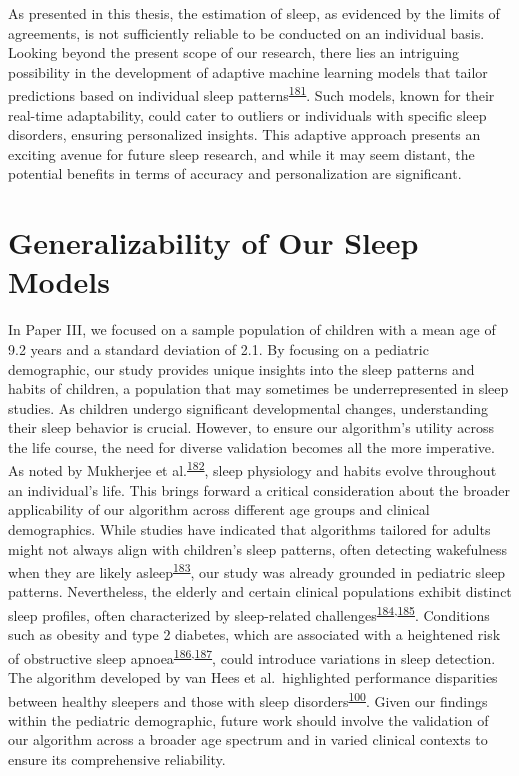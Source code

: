\documentclass[
  10pt,
]{scrbook}
\begin{document}
As presented in this thesis, the estimation of sleep, as evidenced by
the limits of agreements, is not sufficiently reliable to be conducted
on an individual basis. Looking beyond the present scope of our
research, there lies an intriguing possibility in the development of
adaptive machine learning models that tailor predictions based on
individual sleep
patterns\textsuperscript{\protect\hyperlink{ref-oyebode_2023}{181}}.
Such models, known for their real-time adaptability, could cater to
outliers or individuals with specific sleep disorders, ensuring
personalized insights. This adaptive approach presents an exciting
avenue for future sleep research, and while it may seem distant, the
potential benefits in terms of accuracy and personalization are
significant.

\hypertarget{generalizability-of-our-sleep-models}{%
\section{Generalizability of Our Sleep
Models}\label{generalizability-of-our-sleep-models}}

In Paper III, we focused on a sample population of children with a mean
age of 9.2 years and a standard deviation of 2.1. By focusing on a
pediatric demographic, our study provides unique insights into the sleep
patterns and habits of children, a population that may sometimes be
underrepresented in sleep studies. As children undergo significant
developmental changes, understanding their sleep behavior is crucial.
However, to ensure our algorithm's utility across the life course, the
need for diverse validation becomes all the more imperative. As noted by
Mukherjee et
al.\textsuperscript{\protect\hyperlink{ref-mukherjee_2015}{182}}, sleep
physiology and habits evolve throughout an individual's life. This
brings forward a critical consideration about the broader applicability
of our algorithm across different age groups and clinical demographics.
While studies have indicated that algorithms tailored for adults might
not always align with children's sleep patterns, often detecting
wakefulness when they are likely
asleep\textsuperscript{\protect\hyperlink{ref-quante_2018}{183}}, our
study was already grounded in pediatric sleep patterns. Nevertheless,
the elderly and certain clinical populations exhibit distinct sleep
profiles, often characterized by sleep-related
challenges\textsuperscript{\protect\hyperlink{ref-cassidy_2016}{184},\protect\hyperlink{ref-espiritu_2008}{185}}.
Conditions such as obesity and type 2 diabetes, which are associated
with a heightened risk of obstructive sleep
apnoea\textsuperscript{\protect\hyperlink{ref-altaf_2017}{186},\protect\hyperlink{ref-heinzer_2015}{187}},
could introduce variations in sleep detection. The algorithm developed
by van Hees et al.~highlighted performance disparities between healthy
sleepers and those with sleep
disorders\textsuperscript{\protect\hyperlink{ref-van_hees_estimating_2018}{100}}.
Given our findings within the pediatric demographic, future work should
involve the validation of our algorithm across a broader age spectrum
and in varied clinical contexts to ensure its comprehensive reliability.
\end{document}
